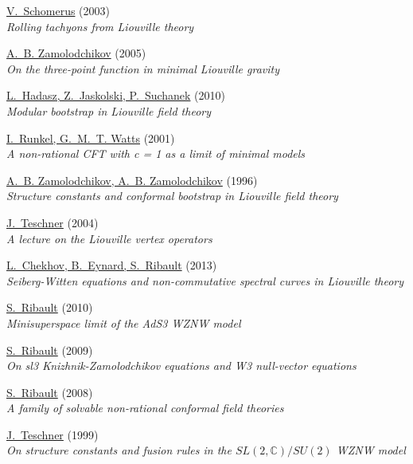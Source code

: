 \begin{thebibliography}{10}
\href{http://arxiv.org/abs/hep-th/0306026}{V.~Schomerus} (2003)\\ {\em Rolling
  tachyons from Liouville theory\/}

\href{http://arxiv.org/abs/hep-th/0505063}{A.~B. Zamolodchikov} (2005)\\ {\em
  On the three-point function in minimal Liouville gravity\/}

\href{http://arxiv.org/abs/0911.4296}{L.~Hadasz, Z.~Jaskolski, P.~Suchanek}
  (2010)\\ {\em {Modular bootstrap in Liouville field theory}\/}

\href{http://arxiv.org/abs/hep-th/0107118}{I.~Runkel, G.~M.~T. Watts} (2001)\\
  {\em A non-rational CFT with c = 1 as a limit of minimal models\/}

\href{http://arxiv.org/abs/hep-th/9506136}{A.~B. Zamolodchikov, A.~B.
  Zamolodchikov} (1996)\\ {\em Structure constants and conformal bootstrap in
  Liouville field theory\/}

\href{http://arxiv.org/abs/hep-th/0303150}{J.~Teschner} (2004)\\ {\em A lecture
  on the Liouville vertex operators\/}

\href{http://arxiv.org/abs/1209.3984}{L.~Chekhov, B.~Eynard, S.~Ribault}
  (2013)\\ {\em {Seiberg-Witten equations and non-commutative spectral curves
  in Liouville theory}\/}

\href{http://arxiv.org/abs/0912.4481}{S.~Ribault} (2010)\\ {\em {Minisuperspace
  limit of the AdS3 WZNW model}\/}

\href{http://arxiv.org/abs/0811.4587}{S.~Ribault} (2009)\\ {\em {On sl3
  Knizhnik-Zamolodchikov equations and W3 null-vector equations}\/}

\href{http://arxiv.org/abs/0803.2099}{S.~Ribault} (2008)\\ {\em {A family of
  solvable non-rational conformal field theories}\/}

\href{http://arxiv.org/abs/hep-th/9712256}{J.~Teschner} (1999)\\ {\em On
  structure constants and fusion rules in the $SL(2,\mathbb{C})/SU(2)$ {WZNW}
  model\/}


\end{thebibliography}
